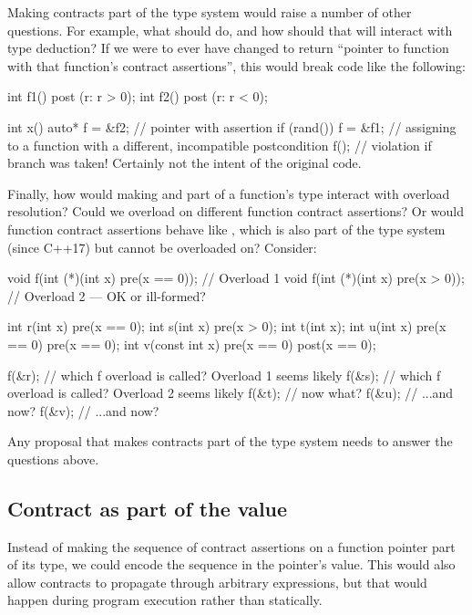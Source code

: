 Making contracts part of the type system would raise a number of other questions. For example, what should  do, and how should that will interact with type deduction? If we were to ever have  changed to return ``pointer to function with that function's contract assertions'', this would break code like the following:
\begin{codeblock}
int f1() post (r: r > 0);
int f2() post (r: r < 0);

int x() {
  auto* f = &f2;   // pointer with assertion 
  if (rand()) {
    f = &f1;  // assigning to a function with a different, incompatible postcondition
  }
  f();  // violation if branch was taken! Certainly not the intent of the original code.
}
\end{codeblock}
Finally, how would making  and  part of a function's type interact with overload resolution? Could we overload on different function contract assertions? Or would function contract assertions behave like , which is also part of the type system (since C++17) but cannot be overloaded on? Consider:
\begin{codeblock}
void f(int (*)(int x) pre(x == 0));  // Overload 1
void f(int (*)(int x) pre(x > 0));   // Overload 2 --- OK or ill-formed?

int r(int x) pre(x == 0);
int s(int x) pre(x > 0);
int t(int x);
int u(int x) pre(x == 0) pre(x == 0);
int v(const int x) pre(x == 0) post(x == 0);

f(&r);  // which f overload is called? Overload 1 seems likely
f(&s);  // which f overload is called? Overload 2 seems likely
f(&t);  // now what?
f(&u);  // ...and now?
f(&v);  // ...and now?
\end{codeblock}
Any proposal that makes contracts part of the type system needs to answer the questions above.


\subsection{Contract as part of the value}
\label{value}

Instead of making the sequence of contract assertions on a function pointer part of its type, we could encode the sequence in the pointer's value. This would also allow contracts to propagate through arbitrary expressions, but that would happen during program execution rather than statically.

